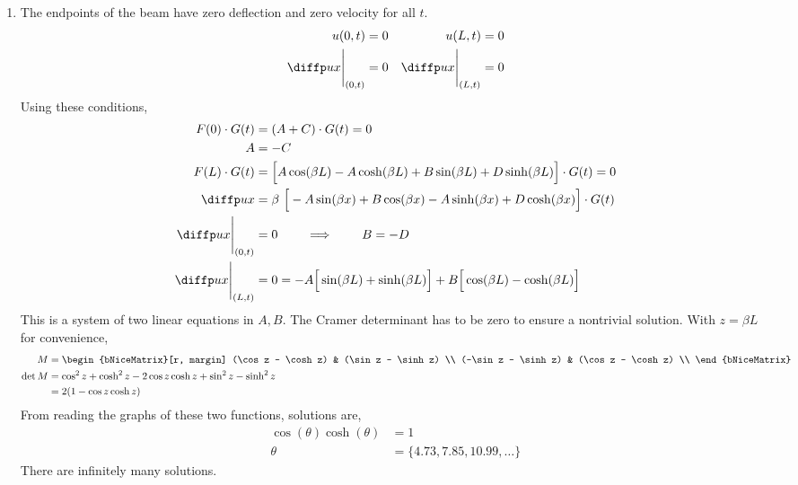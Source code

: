 \begin{enumerate}
    \item The endpoints of the beam have zero deflection and zero velocity for all $ t $.
          \begin{align}
              u(0, t)                   & = 0 & u(L, t)                   & = 0 \\
              \diffp ux \Bigg|_{(0, t)} & = 0 & \diffp ux \Bigg|_{(L, t)} & = 0
          \end{align}
          Using these conditions,
          \begin{align}
              F(0) \cdot G(t) & = (A + C) \cdot G(t) = 0                        \\
              A               & = -C                                            \\
              F(L) \cdot G(t) & = \Big[A\cos(\beta L)  - A\cosh(\beta L)
              + B\sin(\beta L) + D \sinh(\beta L)\Big] \cdot G(t) = 0           \\
              \diffp ux       & = \beta\ \Big[ -A\sin(\beta x) + B\cos(\beta x)
              - A\sinh(\beta x) + D\cosh(\beta x) \Big] \cdot G(t)              \\
              \diffp ux
              \Bigg|_{(0, t)} & = 0 \qquad \implies \qquad B = -D               \\
              \diffp ux
              \Bigg|_{(L, t)} & = 0 = -A \Big[ \sin(\beta L) +
                  \sinh(\beta L) \Big] + B \Big[ \cos(\beta L) - \cosh(\beta L) \Big]
          \end{align}
          This is a system of two linear equations in $ A, B $. The Cramer
          determinant has to be zero to ensure a nontrivial solution. With
          $ z = \beta L $ for convenience,
          \begin{align}
              M       & = \begin{bNiceMatrix}[r, margin]
                              (\cos z - \cosh z)  & (\sin z - \sinh z) \\
                              (-\sin z - \sinh z) & (\cos z - \cosh z) \\
                          \end{bNiceMatrix} \\
              \det{M} & = \cos^2 z + \cosh^2 z - 2\cos z \cosh z
              + \sin^2 z - \sinh^2 z                               \\
                      & = 2(1 - \cos z \cosh z)
          \end{align}
          From reading the graphs of these two functions, solutions are,
          \begin{align}
              \cos(\theta) \cosh(\theta) & = 1                            \\
              \theta                     & = \{4.73, 7.85, 10.99, \dots\}
          \end{align}
          There are infinitely many solutions.


\end{enumerate}
